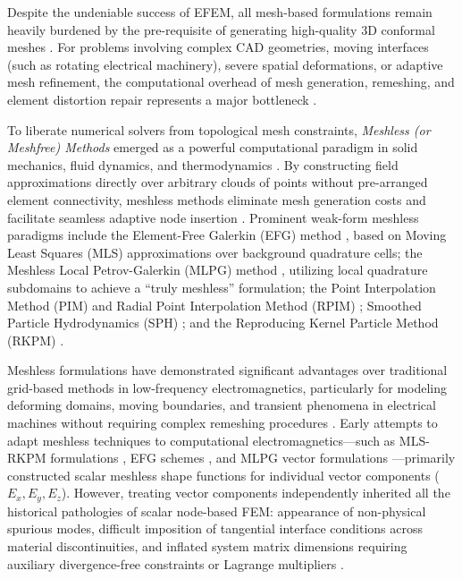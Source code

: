 \documentclass[preprint,12pt]{elsarticle}
\begin{document}
Despite the undeniable success of EFEM, all mesh-based formulations remain heavily burdened by the pre-requisite of generating high-quality 3D conformal meshes \cite{idelsohn2006mesh, liu2009mesh}. For problems involving complex CAD geometries, moving interfaces (such as rotating electrical machinery), severe spatial deformations, or adaptive mesh refinement, the computational overhead of mesh generation, remeshing, and element distortion repair represents a major bottleneck \cite{idelsohn2006mesh, liu2009mesh, slak2018refined}.

To liberate numerical solvers from topological mesh constraints, \emph{Meshless (or Meshfree) Methods} emerged as a powerful computational paradigm in solid mechanics, fluid dynamics, and thermodynamics \cite{liu2009mesh, liu2005introduction, atluri2002meshless}. By constructing field approximations directly over arbitrary clouds of points without pre-arranged element connectivity, meshless methods eliminate mesh generation costs and facilitate seamless adaptive node insertion \cite{liu2009mesh, belytschko1994element}. Prominent weak-form meshless paradigms include the Element-Free Galerkin (EFG) method \cite{belytschko1994element}, based on Moving Least Squares (MLS) approximations over background quadrature cells; the Meshless Local Petrov-Galerkin (MLPG) method \cite{atluri1998new, atluri2002meshless}, utilizing local quadrature subdomains to achieve a ``truly meshless'' formulation; the Point Interpolation Method (PIM) and Radial Point Interpolation Method (RPIM) \cite{liu2001point, liu2005introduction}; Smoothed Particle Hydrodynamics (SPH) \cite{monaghan1992smoothed}; and the Reproducing Kernel Particle Method (RKPM) \cite{liu2009mesh}.

Meshless formulations have demonstrated significant advantages over traditional grid-based methods in low-frequency electromagnetics, particularly for modeling deforming domains, moving boundaries, and transient phenomena in electrical machines without requiring complex remeshing procedures \cite{viana1999moving, parreira2006element, coppoli2012induction}. Early attempts to adapt meshless techniques to computational electromagnetics---such as MLS-RKPM formulations \cite{viana1999moving}, EFG schemes \cite{cingoski1998element, parreira2006element}, and MLPG vector formulations \cite{atluri2002meshless,fonseca2008imposing, nicomedes2012meshless}---primarily constructed scalar meshless shape functions for individual vector components ($E_x, E_y, E_z$). However, treating vector components independently inherited all the historical pathologies of scalar node-based FEM: appearance of non-physical spurious modes, difficult imposition of tangential interface conditions across material discontinuities, and inflated system matrix dimensions requiring auxiliary divergence-free constraints or Lagrange multipliers \cite{nicomedes2015mixed, lima2016metodos, ortiz2023tese}.
\end{document}
